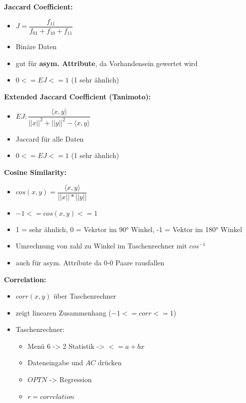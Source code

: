 \documentclass[a4paper]{article}
\begin{document}
\begin{landscape}
\begin{multicols}{3}
            \textbf{Jaccard Coefficient:}
            \begin{itemize}[noitemsep,nolistsep]
                \item $ J = \dfrac{f_{11}}{f_{01}+ f_{10}+ f_{11}} $
                \item Binäre Daten
                \item gut für \textbf{asym. Attribute}, da Vorhandensein gewertet wird
                \item $ 0 <= EJ <= 1$ (1 sehr ähnlich)

            \end{itemize}

            \textbf{Extended Jaccard Coefficient (Tanimoto):}
            \begin{itemize}[noitemsep,nolistsep]
                \item $EJ: \dfrac{\langle x, y \rangle}{||x||^2 + ||y||^2 - \langle x,y \rangle}$
                \item Jaccard für alle Daten
                \item $ 0 <= EJ <= 1$ (1 sehr ähnlich)
            \end{itemize}

            \textbf{Cosine Similarity:}
            \begin{itemize}[noitemsep,nolistsep]
                \item $cos(x,y) =  \dfrac{\langle x, y \rangle}{||x|| * ||y||}$
                \item $ -1 <= cos(x,y) <= 1$
                \item 1 = sehr ähnlich, 0 = Vekrtor im 90° Winkel, -1 = Vektor im 180° Winkel
                \item Umrechnung von zahl zu Winkel im Taschenrechner mit $cos^{-1}$
                \item auch für asym. Attribute da 0-0 Paare rausfallen
            \end{itemize}

            \textbf{Correlation:}
            \begin{itemize}[noitemsep,nolistsep]
                \item $corr(x,y)$ über Taschenrechner
                \item zeigt linearen Zusammenhang ($-1 <= corr <= 1$) 
                \item Taschenrechner:
                \begin{itemize}[noitemsep,nolistsep]
                    \item Menü 6 -> 2 Statistik -> $< = a+bx$
                    \item Dateneingabe und $AC$ drücken
                    \item $OPTN$ -> Regression
                    \item $ r = correlation $
                \end{itemize}
            \end{itemize}



\end{multicols}
\end{landscape}
\end{document}
